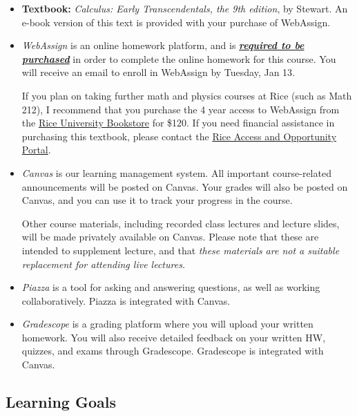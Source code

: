 \documentclass[11pt]{article}
\newcommand{\secondday}{Tuesday, Jan 13}
\begin{document}
\begin{itemize}
    \item \textbf{Textbook:} \textit{Calculus: Early Transcendentals, the 9th edition}, by Stewart. An e-book version of this text is provided with your purchase of WebAssign.

    \item \textit{WebAssign} is an online homework platform, and is \emph{\underline{\textbf{required to be purchased}}} in order to complete the online homework for this course. You will receive an email to enroll in WebAssign by \secondday.

    If you plan on taking further math and physics courses at Rice (such as Math 212), I recommend that you purchase the 4 year access to WebAssign from the \href{https://www.bkstr.com/riceuniversitystore/shop/textbooks-and-course-materials}{Rice University Bookstore} for \$120.  If you need financial assistance in purchasing this textbook, please contact the \href{https://aop.rice.edu/making-textbook-aop-request}{Rice Access and Opportunity Portal}.  
    
    \item \textit{Canvas} is our learning management system.  All important course-related announcements will be posted on Canvas.  Your grades will also be posted on Canvas, and you can use it to track your progress in the course.
    
    Other course materials, including recorded class lectures and lecture slides, will be made privately available on Canvas. Please note that these are intended to supplement lecture, and that \emph{these materials are not a suitable replacement for attending live lectures.}
    
    \item \textit{Piazza} is a tool for asking and answering questions, as well as working collaboratively. Piazza is integrated with Canvas.

    \item \textit{Gradescope} is a grading platform where you will upload your written homework.  You will also receive detailed feedback on your written HW, quizzes, and exams through Gradescope. Gradescope is integrated with Canvas.


\end{itemize}


\subsection{Learning Goals}
\end{document}
